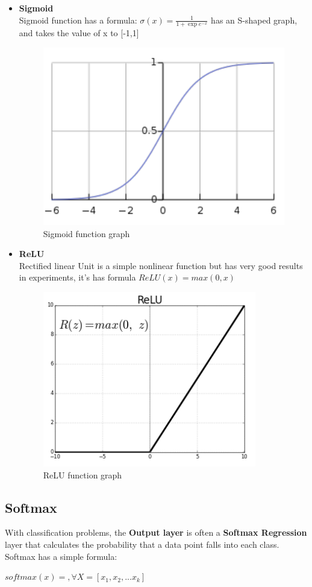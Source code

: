 \begin{itemize}
	\item \textbf{Sigmoid}\\
	Sigmoid function has a formula: $ \sigma(x) = \frac{1}{1+\exp e^{-x}}$ has an S-shaped graph, and takes the value of x to [-1,1]
	\begin{center}
		\begin{figure}[H]
			\centering
			\includegraphics[width=0.5\columnwidth]{images/chap2/sigmoid.png}
			\caption{Sigmoid function graph}
			\label{chap2:sigmoid}
		\end{figure}
	\end{center}
	\item \textbf{ReLU}\\
	Rectified linear Unit is a simple nonlinear function but has very good results in experiments, it's has formula $ReLU(x) = max (0,x)$
		\begin{center}
		\begin{figure}[H]
			\centering
			\includegraphics[width=0.5\columnwidth]{images/chap2/ReLU.png}
			\caption{ReLU function graph}
			\label{chap2:relu}
		\end{figure}
	\end{center}
\end{itemize}
\vspace{-1cm}
\subsection{Softmax}

With classification problems, the \textbf{Output layer} is often a \textbf{Softmax Regression} layer that calculates the probability that a data point falls into each class. Softmax has a simple formula:\\
\begin{center}
	$ softmax(x) = $$, \forall X = [x_{1},x_{2},...x_{k}]$
\end{center}


